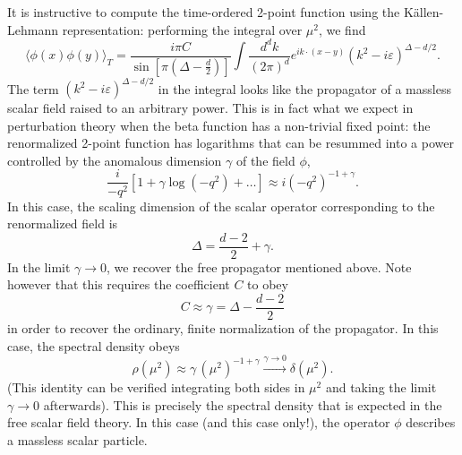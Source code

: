 \documentclass[a4paper,12pt]{article}
\numberwithin{equation}{section}
\begin{document}
It is instructive to compute the time-ordered 2-point function using the Källen-Lehmann representation: performing the integral over $\mu^2$, we find
\begin{equation}
	\langle \phi(x) \phi(y) \rangle_T
	= \frac{i \pi C}
	{\sin\left[ \pi \left( \Delta - \frac{d}{2} \right) \right]}
	\int \frac{d^dk}{(2\pi)^d}
	e^{i k \cdot (x - y)}
	\left( k^2 - i \varepsilon \right)^{\Delta - d/2}.
\end{equation}
The term $\left( k^2 - i \varepsilon \right)^{\Delta - d/2}$ in the integral looks like the propagator of a massless scalar field raised to an arbitrary power. This is in fact what we expect in perturbation theory when the beta function has a non-trivial fixed point: the renormalized 2-point function has logarithms that can be resummed into a power controlled by the anomalous dimension $\gamma$ of the field $\phi$,
\begin{equation}
	\frac{i}{-q^2} \left[ 1 + \gamma \log(-q^2) + \ldots \right]
	\approx i (-q^2)^{-1 + \gamma}.
\end{equation}
In this case, the scaling dimension of the scalar operator corresponding to the renormalized field is
\begin{equation}
	\Delta = \frac{d-2}{2} + \gamma.
\end{equation}
In the limit $\gamma \to 0$, we recover the free propagator mentioned above.
Note however that this requires the coefficient $C$ to obey
\begin{equation}
	C \approx \gamma = \Delta - \frac{d-2}{2}
	\label{eq:C:freelimit}
\end{equation}
in order to recover the ordinary, finite normalization of the propagator.
In this case, the spectral density obeys
\begin{equation}
	\rho(\mu^2) \approx \gamma \, (\mu^2)^{-1 + \gamma}
	\xrightarrow{\gamma \to 0} \delta(\mu^2).
\end{equation}
(This identity can be verified integrating both sides in $\mu^2$ and taking the limit $\gamma \to 0$ afterwards).
This is precisely the spectral density that is expected in the free scalar field theory. In this case (and this case only!), the operator $\phi$ describes a massless scalar particle.
\end{document}
